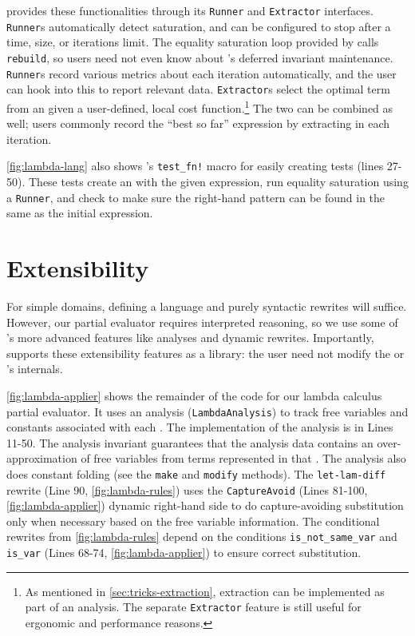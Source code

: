 \egg provides these functionalities through its \texttt{Runner} and
  \texttt{Extractor} interfaces.
\texttt{Runner}s automatically detect saturation, and can be configured to stop
  after a time, \egraph size, or iterations limit.
The equality saturation loop provided by \egg calls \texttt{rebuild}, so users
  need not even know about \egg's deferred invariant maintenance.
\texttt{Runner}s record various metrics about each iteration automatically,
  and the user can hook into this to report relevant data.
\texttt{Extractor}s select the optimal term from an \egraph given a
  user-defined, local cost function.\footnote{
    As mentioned in \autoref{sec:tricks-extraction}, extraction can be
    implemented as part of an \eclass analysis.
    The separate \texttt{Extractor} feature is still useful for ergonomic and
    performance reasons.
  }
The two can be combined as well; users commonly record the ``best so far''
  expression by extracting in each iteration.

\autoref{fig:lambda-lang} also shows \egg's \texttt{test\_fn!}
  macro for easily creating tests (lines 27-50).
These tests create an \egraph with the given expression, run equality saturation
  using a \texttt{Runner}, and check to make sure the right-hand pattern can be
  found in the same \eclass as the initial expression.

\section{Extensibility}
\label{sec:egg-extensible}

For simple domains, defining a language and purely syntactic rewrites will
  suffice.
However, our partial evaluator requires interpreted reasoning, so we use some of
  \egg's more advanced features like \eclass analyses and dynamic rewrites.
Importantly, \egg supports these extensibility features as a library:
  the user need not modify the \egraph or \egg's internals.



\autoref{fig:lambda-applier} shows the remainder of the code for our lambda
  calculus partial evaluator.
It uses an \eclass analysis (\texttt{LambdaAnalysis})
  to track free variables and constants associated
  with each \eclass.
The implementation of the \eclass analysis is in Lines 11-50.
The \eclass analysis invariant
  guarantees that the analysis data contains an over-approximation of free variables
  from terms represented in that \eclass.
The analysis also does constant folding
  (see the \texttt{make} and \texttt{modify} methods).
The \texttt{let-lam-diff} rewrite (Line 90, \autoref{fig:lambda-rules})
  uses the \texttt{CaptureAvoid} (Lines 81-100, \autoref{fig:lambda-applier})
  dynamic right-hand side to do capture-avoiding
  substitution only when necessary based on the free variable information.
The conditional rewrites from \autoref{fig:lambda-rules} depend on the
  conditions \texttt{is\_not\_same\_var} and
  \texttt{is\_var} (Lines 68-74, \autoref{fig:lambda-applier})
  to ensure correct substitution.


